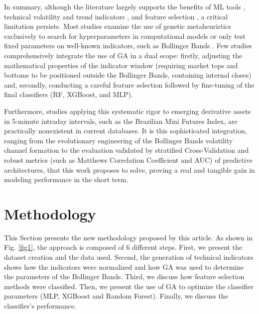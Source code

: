 \documentclass{ieeeaccess}
\begin{document}
In summary, although the literature largely supports the benefits of ML tools \cite{bandgar2025finchronos}, technical volatility and trend indicators \cite{mittal2025machine}, and feature selection \cite{mutinda2026hybrid}, a critical limitation persists. Most studies examine the use of genetic metaheuristics exclusively to search for hyperparameters in computational models \cite{simatupang2026stock} or only test fixed parameters on well-known indicators, such as Bollinger Bands \cite{guo2025empirical}. Few studies comprehensively integrate the use of GA in a dual scope: firstly, adjusting the mathematical properties of the indicator window (requiring market tops and bottoms to be positioned outside the Bollinger Bands, containing internal closes) and, secondly, conducting a careful feature selection followed by fine-tuning of the final classifiers (RF, XGBoost, and MLP).

Furthermore, studies applying this systematic rigor to emerging derivative assets in 5-minute intraday intervals, such as the Brazilian Mini Futures Index, are practically nonexistent in current databases. It is this sophisticated integration, ranging from the evolutionary engineering of the Bollinger Bands volatility channel formation to the evaluation validated by stratified Cross-Validation and robust metrics (such as Matthews Correlation Coefficient and AUC) of predictive architectures, that this work proposes to solve, proving a real and tangible gain in modeling performance in the short term.























\section{Methodology}
\label{sec:methodology}
This Section presents the new methodology proposed by this article. As shown in Fig. \ref{fig1}, the approach is composed of 6 different steps. First, we present the dataset creation and the data used. Second, the generation of technical indicators shows how the indicators were normalized and how GA was used to determine the parameters of the Bollinger Bands. Third, we discuss how feature selection methods were classified. Then, we present the use of GA to optimize the classifier parameters (MLP, XGBoost and Random Forest). Finally, we discuss the classifier's performance.
\end{document}
